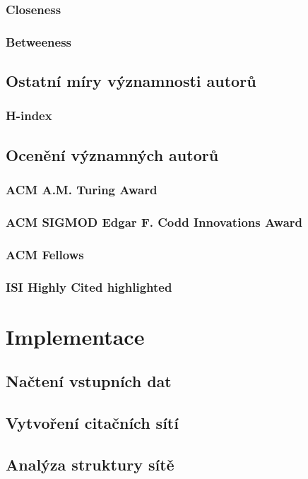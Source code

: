 \documentclass[12pt]{report}
\begin{document}
\subsection{Closeness}
\subsection{Betweeness}

\section{Ostatní míry významnosti autorů}
\lipsum
\subsection{H-index}

\section{Ocenění významných autorů}
\lipsum
\subsection{ACM A.M. Turing Award}
\subsection{ACM SIGMOD Edgar F. Codd Innovations Award}
\subsection{ACM Fellows}
\subsection{ISI Highly Cited highlighted}

\chapter{Implementace}
\lipsum
\section{Načtení vstupních dat}

\section{Vytvoření citačních sítí}

\section{Analýza struktury sítě}
\end{document}
